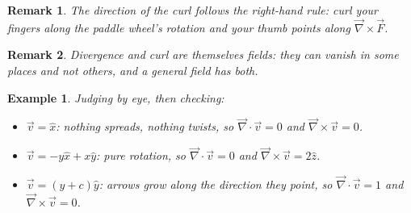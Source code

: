 \documentclass{article}
\newtheorem*{example}{Example}
\newtheorem{remark}{Remark}
\begin{document}
\begin{remark}
    The direction of the curl follows the right-hand rule: curl your fingers along the paddle wheel's rotation and your thumb points along $\vec{\nabla}\times\vec{F}$.
\end{remark}
\begin{remark}
    Divergence and curl are themselves fields: they can vanish in some places and not others, and a general field has both.
\end{remark}
\begin{example}
    Judging by eye, then checking:
    \begin{itemize}
        \item $\vec{v} = \hat{x}$: nothing spreads, nothing twists, so $\vec{\nabla}\cdot\vec{v} = 0$ and $\vec{\nabla}\times\vec{v} = 0$.
        \item $\vec{v} = -y\hat{x} + x\hat{y}$: pure rotation, so $\vec{\nabla}\cdot\vec{v} = 0$ and $\vec{\nabla}\times\vec{v} = 2\hat{z}$.
        \item $\vec{v} = (y+c)\hat{y}$: arrows grow along the direction they point, so $\vec{\nabla}\cdot\vec{v} = 1$ and $\vec{\nabla}\times\vec{v} = 0$.
    \end{itemize}
\end{example}
\end{document}
